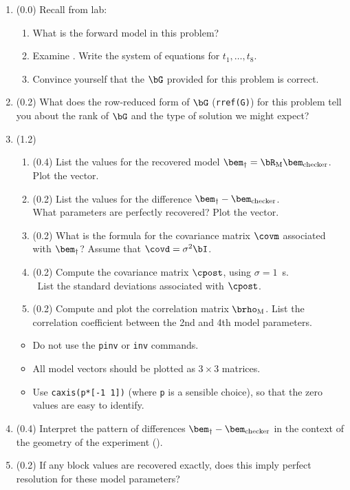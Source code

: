 \documentclass[11pt,titlepage,fleqn]{article}
\begin{document}

\begin{enumerate}

\item (0.0) Recall from lab:
%
\begin{enumerate}
\item What is the forward model in this problem?
\item Examine . Write the system of equations for $t_1, \ldots, t_8$.
\item Convince yourself that the $\bG$ provided for this problem is correct.
\end{enumerate}

\item (0.2) What does the row-reduced form of $\bG$ (\verb+rref(G)+) for this problem tell you about the rank of $\bG$ and the type of solution we might expect?

\item (1.2) 
\begin{enumerate}
\item (0.4) List the values for the recovered model $\bem_{\dagger} = \bR_{\rm M}\bem_{\rm checker}$. Plot the vector.
\item (0.2) List the values for the difference $\bem_{\dagger}-\bem_{\rm checker}$. \\
What parameters are perfectly recovered? Plot the vector.
\item (0.2) What is the formula for the covariance matrix $\covm$ associated with $\bem_{\dagger}$? Assume that $\covd = \sigma^2\bI$.
\item (0.2) Compute the covariance matrix $\cpost$, using $\sigma = 1$~s. \\\
List the standard deviations associated with $\cpost$.
\item (0.2) Compute and plot the correlation matrix $\brho_{\rm M}$. List the correlation coefficient between the 2nd and 4th model parameters.
\end{enumerate}

\begin{itemize}
\item Do not use the \verb+pinv+ or \verb+inv+ commands.
\item All model vectors should be plotted as $3 \times 3$ matrices.
\item Use \verb+caxis(p*[-1 1])+ (where \verb+p+ is a sensible choice), so that the zero values are easy to identify.
\end{itemize}

\item (0.4) Interpret the pattern of differences $\bem_{\dagger}-\bem_{\rm checker}$ in the context of the geometry of the experiment ().

\item (0.2) If any block values are recovered exactly, does this imply perfect resolution for these model parameters?
\end{enumerate}
\end{document}
